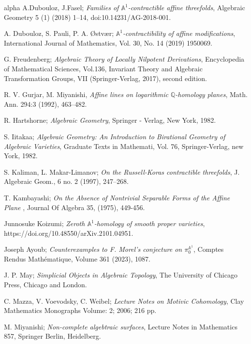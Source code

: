 \documentclass[11pt, reqno]{amsart}
\theoremstyle{plain}
\theoremstyle{definition}
\begin{document}
\begin{thebibliography}{alpha}
		 A.Dubouloz, J.Fasel; \emph{Families of $\mathbb{A}^1$-contractible affine threefolds}, Algebraic Geometry 5 (1) (2018) 1–14, doi:10.14231/AG-2018-001.
		
		 A. Dubouloz, S. Pauli, P. A. \O stv\ae r; \emph{$\mathbb{A}^1$-contractibility of affine modifications}, International Journal of Mathematics, Vol. 30, No. 14 (2019) 1950069.
		
		 G. Freudenberg; \emph{Algebraic Theory of Locally Nilpotent Derivations}, Encyclopedia of Mathematical Sciences, Vol.136, Invariant Theory and Algebraic Transformation Groups, VII (Springer-Verlag, 2017), second edition.
		
		 R. V. Gurjar, M. Miyanishi, \emph{Affine lines on logarithmic $\mathbb{Q}$-homology planes}, Math. Ann. 294:3 (1992), 463–482.
		
		 R. Hartshorne; \emph{Algebraic Geometry}, Springer - Verlag, New York, 1982.
		
		 S. Iitakaa; \emph{Algebraic Geometry: An Introduction to Birational Geometry of Algebraic Varieties}, Graduate Texts in Mathemati, Vol. 76, Springer-Verlag, new York, 1982.
		
		 S. Kaliman, L. Makar-Limanov; \emph{On the Russell-Koras contractible threefolds}, J. Algebraic Geom., 6 no. 2 (1997), 247–268.
		
		 T. Kambayashi; \emph{On the Absence of Nontrivial Separable Forms of the Affine Plane }, Journal Of Algebra 35, (1975), 449-456.
		
		 Junnosuke Koizumi; \emph{Zeroth $\mathbb{A}^1$-homology of smooth proper varieties}, https://doi.org/10.48550/arXiv.2101.04951.

 Joseph Ayoub; \emph{Counterexamples to F. Morel's conjecture on $\pi_0^{\mathbb{A}^1}$}, Comptes Rendus Mathématique, Volume 361 (2023), 1087.
		
		
		 J. P. May; \emph{Simplicial Objects in Algebraic Topology}, The University of Chicago Press, Chicago and London.
		
		 C. Mazza, V. Voevodsky, C. Weibel; \emph{Lecture Notes on Motivic Cohomology}, Clay Mathematics Monographs Volume: 2; 2006; 216 pp.
		
		 M. Miyanishi; \emph{Non-complete algebtraic surfaces}, Lecture Notes in Mathematics 857, Springer Berlin, Heidelberg.
		

\end{thebibliography}
\end{document}
